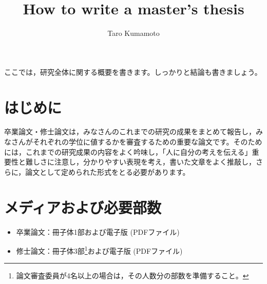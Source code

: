 \documentclass{kupaper}
\begin{document}


\title{How to write a master's thesis}
\author{Taro Kumamoto}


\Maketitle


\begin{Abstract}
	ここでは，研究全体に関する概要を書きます。しっかりと結論も書きましょう。
\end{Abstract}

\begin{abstract}
\end{abstract}

\setcounter{page}{1}
\tableofcontents

\chapter{はじめに}

卒業論文・修士論文は，みなさんのこれまでの研究の成果をまとめて報告し，みなさんがそれぞれの学位に値するかを審査するための重要な論文です。そのためには，これまでの研究成果の内容をよく吟味し，「人に自分の考えを伝える」重要性と難しさに注意し，分かりやすい表現を考え，書いた文章をよく推敲し，さらに，論文として定められた形式をとる必要があります。
\chapter{メディアおよび必要部数}
\begin{itemize}
	\item 卒業論文：冊子体1部および電子版 (PDFファイル) 
	\item 修士論文：冊子体3部\footnote{論文審査委員が4名以上の場合は，その人数分の部数を準備すること。}および電子版 (PDFファイル) 
\end{itemize}
\end{document}
